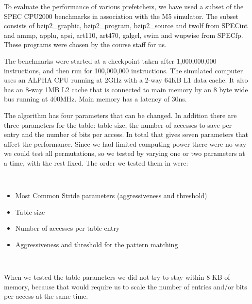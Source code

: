 To evaluate the performance of various prefetchers, we have used
a subset of the SPEC CPU2000 benchmarks in association with the M5
simulator. The subset consists of bzip2\_graphic, bzip2\_program, bzip2\_source and twolf from
SPECint and ammp, applu, apsi, art110, art470, galgel, swim and wupwise from SPECfp.
These programs were chosen by the course staff for us.

The benchmarks were started at a checkpoint taken after
1,000,000,000 instructions, and then run for 100,000,000 instructions.
The simulated computer uses an ALPHA CPU running at 2GHz
with a 2-way 64KB L1 data cache. It also has an 8-way 1MB L2 cache that is
connected to main memory by an 8 byte wide bus running at
400MHz. Main memory has a latency of 30ns.

The algorithm has four parameters that can be changed. In addition there are
three parameters for the table: table size, the number of accesses to save per
entry and the number of bits per access. In total that gives seven parameters
that affect the performance. Since we had limited computing power there were no
way we could test all permutations, so we tested by varying one or two
parameters at a time, with the rest fixed. The order we tested them in were:

~
\begin{itemize}
	\item Most Common Stride parameters (aggressiveness and threshold)
	\item Table size
	\item Number of accesses per table entry
	\item Aggressiveness and threshold for the pattern matching
\end{itemize}
~

When we tested the table parameters we did not try to stay within 8 KB of
memory, because that would require us to scale the number of entries and/or
bits per access at the same time.

